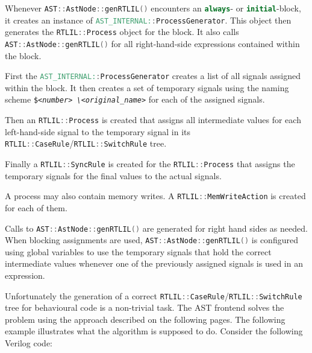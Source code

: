 \begin{itemize}
\item Whenever \lstinline[language=C++]{AST::AstNode::genRTLIL()} encounters an \lstinline[language=Verilog]{always}-
or \lstinline[language=Verilog]{initial}-block, it creates an instance of
\lstinline[language=Verilog]{AST_INTERNAL::ProcessGenerator}. This object then generates the
\lstinline[language=C++]{RTLIL::Process} object for the block. It also calls \lstinline[language=C++]{AST::AstNode::genRTLIL()}
for all right-hand-side expressions contained within the block.
%
\begin{sloppypar}
\item First the  \lstinline[language=Verilog]{AST_INTERNAL::ProcessGenerator} creates a list of all signals assigned
within the block. It then creates a set of temporary signals using the naming scheme {\tt \$\it<number>\tt
\textbackslash\it <original\_name>} for each of the assigned signals.
\end{sloppypar}
%
\item Then an \lstinline[language=C++]{RTLIL::Process} is created that assigns all intermediate values for each left-hand-side
signal to the temporary signal in its \lstinline[language=C++]{RTLIL::CaseRule}/\lstinline[language=C++]{RTLIL::SwitchRule} tree.
%
\item Finally a \lstinline[language=C++]{RTLIL::SyncRule} is created for the \lstinline[language=C++]{RTLIL::Process} that
assigns the temporary signals for the final values to the actual signals.
%
\item A process may also contain memory writes. A \lstinline[language=C++]{RTLIL::MemWriteAction} is created for each of them.
%
\item Calls to \lstinline[language=C++]{AST::AstNode::genRTLIL()} are generated for right hand sides as needed. When blocking
assignments are used, \lstinline[language=C++]{AST::AstNode::genRTLIL()} is configured using global variables to use
the temporary signals that hold the correct intermediate values whenever one of the previously assigned signals is used
in an expression.
\end{itemize}

Unfortunately the generation of a correct \lstinline[language=C++]{RTLIL::CaseRule}/\lstinline[language=C++]{RTLIL::SwitchRule}
tree for behavioural code is a non-trivial task. The AST frontend solves the problem using the approach described on the following
pages. The following example illustrates what the algorithm is supposed to do. Consider the following Verilog code:

